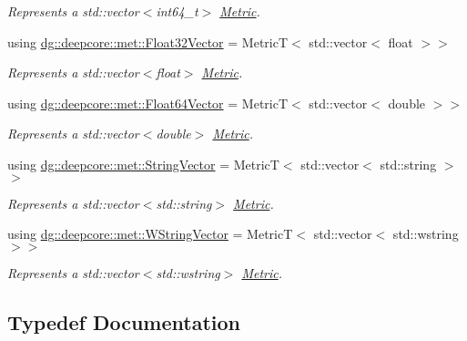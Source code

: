 \begin{DoxyCompactItemize}
\begin{DoxyCompactList}\small\item\em Represents a {\ttfamily std\+::vector$<$int64\+\_\+t$>$} \hyperlink{classdg_1_1deepcore_1_1_metric}{Metric}. \end{DoxyCompactList}\item 
using \hyperlink{group___process_metrics_gae14eba8bf601ac77a15bd03607090d68}{dg\+::deepcore\+::met\+::\+Float32\+Vector} = MetricT$<$ std\+::vector$<$ float $>$$>$
\begin{DoxyCompactList}\small\item\em Represents a {\ttfamily std\+::vector$<$float$>$} \hyperlink{classdg_1_1deepcore_1_1_metric}{Metric}. \end{DoxyCompactList}\item 
using \hyperlink{group___process_metrics_ga411093a58279bc6c2a2a4d2e850967d6}{dg\+::deepcore\+::met\+::\+Float64\+Vector} = MetricT$<$ std\+::vector$<$ double $>$$>$
\begin{DoxyCompactList}\small\item\em Represents a {\ttfamily std\+::vector$<$double$>$} \hyperlink{classdg_1_1deepcore_1_1_metric}{Metric}. \end{DoxyCompactList}\item 
using \hyperlink{group___process_metrics_gac7024897060861b0e561fca42cea8aeb}{dg\+::deepcore\+::met\+::\+String\+Vector} = MetricT$<$ std\+::vector$<$ std\+::string $>$$>$
\begin{DoxyCompactList}\small\item\em Represents a {\ttfamily std\+::vector$<$std\+::string$>$} \hyperlink{classdg_1_1deepcore_1_1_metric}{Metric}. \end{DoxyCompactList}\item 
using \hyperlink{group___process_metrics_ga3cc43c3b19277ff7be5246bcc8c1e954}{dg\+::deepcore\+::met\+::\+W\+String\+Vector} = MetricT$<$ std\+::vector$<$ std\+::wstring $>$$>$
\begin{DoxyCompactList}\small\item\em Represents a {\ttfamily std\+::vector$<$std\+::wstring$>$} \hyperlink{classdg_1_1deepcore_1_1_metric}{Metric}. \end{DoxyCompactList}\end{DoxyCompactItemize}


\subsection{Typedef Documentation}
